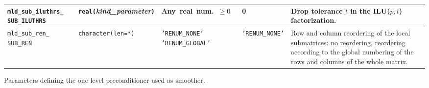 \begin{center}
\begin{tabular}{|p{3.5cm}|l|p{3.2cm}|l|p{5cm}|}
\verb|mld_sub_iluthrs_| \break \verb|SUB_ILUTHRS|  & \verb|real(|\emph{kind\_parameter}\verb|)|
                         & Any~real~num.~$\ge 0$
                         & 0
                         & Drop tolerance $t$ in the ILU($p,t$) factorization. \\ \hline
\verb|mld_sub_ren_| \break \verb|SUB_REN|   & \verb|character(len=*)|
                         & \texttt{'RENUM\_NONE'}  \texttt{'RENUM\_GLOBAL'} %
                         & \texttt{'RENUM\_NONE'}
                         & Row and column reordering of the local submatrices: no reordering,
                           reordering according to the global numbering of the rows and columns of
                           the whole matrix. \\
\hline
\end{tabular}
\end{center}
\caption{Parameters defining the one-level preconditioner used as smoother.
\label{tab:p_smoother}}  
\esideways
                   
